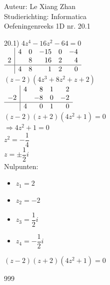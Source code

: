 \documentclass[a4paper]{article}
\begin{document}
\noindent \large Auteur: Le Xiang Zhan \\
\noindent \large Studierichting: Informatica\\
\noindent \large Oefeningenreeks 1D nr. 20.1\\

\medskip

\normalsize
20.1) $4z^4 - 16z^2 - 64 = 0$\\

$\\
\begin{array}{r|rrrrr}
       & 4 & 0 & -15 & 0 & -4 \\
    2  &   & 8 & 16  & 2 & 4  \\ 
    \hline
       & 4 & 8 & 1   & 2 & 0
\end{array}
$\\

$(z-2)(4z^3 + 8z^2 + z + 2)$\\

$\\
\begin{array}{r|rrrr}
       & 4 & 8  & 1  & 2 \\
-2     &   & -8 & 0  & -2 \\ 
        \hline
       & 4 & 0  & 1  & 0
\end{array}
$\\

$(z-2)(z+2)(4z^2 + 1) = 0$\\

$\Rightarrow 4z^2 + 1 = 0$\\

$z^2 = -\dfrac{1}{4}$\\

$z = \pm\dfrac{1}{2}i$\\

Nulpunten:\\

\begin{itemize}
    \item $z_1 = 2$
    \item $z_2 = -2$
    \item $z_3 = \dfrac{1}{2}i$
    \item $z_4 = -\dfrac{1}{2}i$
\end{itemize}


\noindent $(z-2)(z+2)(4z^2 + 1) = 0$\\






\begin{thebibliography}{999}
\end{thebibliography}
\end{document}
